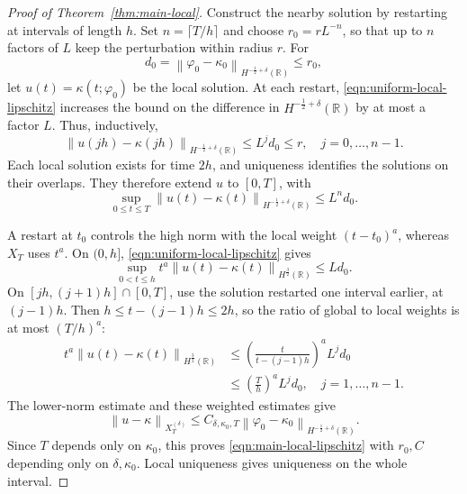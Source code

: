 \documentclass[11pt,reqno]{amsart}
\theoremstyle{plain}
\theoremstyle{definition}
\numberwithin{equation}{section}
\newcommand{\norm}[1]{\left\lVert #1 \right\rVert}
\newcommand{\vph}{\varphi}
\newcommand{\R}{\mathbb{R}}
\newcommand{\hr}[1]{H^{#1}(\R)}
\begin{document}
\begin{proof}[Proof of Theorem~\ref{thm:main-local}]
Construct the nearby solution by restarting at intervals of length $h$.
Set $n=\lceil T/h\rceil$ and choose $r_0=rL^{-n}$, so that up to
$n$ factors of $L$ keep the perturbation within radius $r$. For
\begin{equation*}
    d_0=\norm{\vph_0-\kappa_0}_{\hr{-\frac12+\delta}}\le r_0,
\end{equation*}
let $u(t)=\kappa(t;\vph_0)$ be the local solution. At each restart,
\eqref{eqn:uniform-local-lipschitz} increases the bound on the difference
in $\hr{-\frac12+\delta}$ by at most a factor $L$. Thus, inductively,
\begin{equation*}
    \norm{u(jh)-\kappa(jh)}_{\hr{-\frac12+\delta}}
    \le L^j d_0\le r,
    \quad j=0,\ldots,n-1.
\end{equation*}
Each local solution exists for time $2h$, and uniqueness
identifies the solutions on their overlaps. They therefore extend $u$
to $[0,T]$, with
\begin{equation*}
    \sup_{0\le t\le T}\norm{u(t)-\kappa(t)}_{\hr{-\frac12+\delta}}
    \le L^n d_0.
\end{equation*}

A restart at $t_0$ controls the high norm with the local weight
$(t-t_0)^a$, whereas $X_T$ uses $t^a$. On $(0,h]$,
\eqref{eqn:uniform-local-lipschitz} gives
\begin{equation*}
    \sup_{0<t\le h}t^a\norm{u(t)-\kappa(t)}_{\hr{\frac32}}
    \le Ld_0.
\end{equation*}
On $[jh,(j+1)h]\cap[0,T]$, use the solution restarted one interval
earlier, at $(j-1)h$. Then $h\le t-(j-1)h\le2h$, so the ratio of
global to local weights is at most $(T/h)^a$:
\begin{equation*}
\begin{aligned}
    t^a\norm{u(t)-\kappa(t)}_{\hr{\frac32}}
    &\le \left(\frac{t}{t-(j-1)h}\right)^a L^j d_0\\
    &\le \left(\frac{T}{h}\right)^a L^j d_0,
    \quad j=1,\ldots,n-1.
\end{aligned}
\end{equation*}
The lower-norm estimate and these weighted estimates give
\begin{equation*}
    \norm{u-\kappa}_{X_T^{(\delta)}}
    \le C_{\delta,\kappa_0,T}
    \norm{\vph_0-\kappa_0}_{\hr{-\frac12+\delta}}.
\end{equation*}
Since $T$ depends only on $\kappa_0$, this proves
\eqref{eqn:main-local-lipschitz} with $r_0,C$ depending only on
$\delta,\kappa_0$. Local uniqueness gives uniqueness on the whole interval.
\end{proof}
\end{document}
